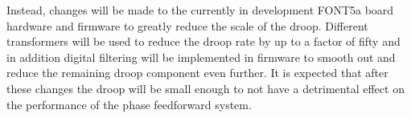 Instead, changes will be made to the currently in development FONT5a board hardware and firmware to greatly reduce the scale of the droop. Different transformers will be used to reduce the droop rate by up to a factor of fifty and in addition digital filtering will be implemented in firmware to smooth out and reduce the remaining droop component even further. It is expected that after these changes the droop will be small enough to not have a detrimental effect on the performance of the phase feedforward system. 











